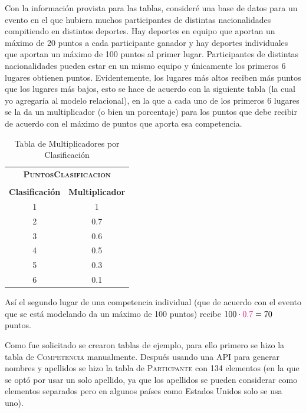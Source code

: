 \documentclass[a4paper, twoside, 12pt]{article}
\begin{document}
Con la información provista para las tablas, consideré una base de datos para un evento en el que hubiera muchos participantes de distintas nacionalidades compitiendo en distintos deportes. Hay deportes en equipo que aportan un máximo de 20 puntos a cada participante ganador y hay deportes individuales que aportan un máximo de 100 puntos al primer lugar. Participantes de distintas nacionalidades pueden estar en un mismo equipo y únicamente los primeros 6 lugares obtienen puntos. Evidentemente, los lugares más altos reciben más puntos que los lugares más bajos, esto se hace de acuerdo con la siguiente tabla (la cual yo agregaría al modelo relacional), en la que a cada uno de los primeros 6 lugares se la da un multiplicador (o bien un porcentaje) para los puntos que debe recibir de acuerdo con el máximo de puntos que aporta esa competencia.

\begin{table}[H]
    \centering
    \begin{tabular}{|cc|}
        \multicolumn{2}{c}{\bfseries{\scshape{PuntosClasificacion}}}\\
        \multicolumn{2}{c}{}\\\hline
        \textbf{Clasificación} &  \textbf{Multiplicador}\\\hline
         1  &   1\\
         2  &   0.7\\
         3  &   0.6\\
         4  &   0.5\\
         5  &   0.3\\
         6  &   0.1\\\hline
    \end{tabular}
    \caption{Tabla de Multiplicadores por Clasificación}
    \label{tab:PuntosClasificacion}
\end{table}

Así el segundo lugar de una competencia individual (que de acuerdo con el evento que se está modelando da un máximo de 100 puntos) recibe $100\cdot{\color{magenta}{0.7}} = 70$ puntos.

Como fue solicitado se crearon tablas de ejemplo, para ello primero se hizo la tabla de \textsc{Competencia} manualmente. Después usando una API para generar nombres y apellidos se hizo la tabla de \textsc{Particpante} con 134 elementos (en la que se optó por usar un solo apellido, ya que los apellidos se pueden considerar como elementos separados pero en algunos países como Estados Unidos solo se usa uno). 
\end{document}
